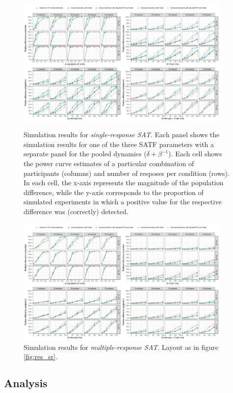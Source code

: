 \documentclass[10pt,letterpaper]{article}
\begin{document}
\begin{figure}
\centering
\includegraphics[width=0.94\textwidth]{../figures/results/results_sr.pdf} %
\caption{\label{fig:res_sr}Simulation results for \textit{single-response SAT}. Each panel shows the simulation results for one of the three SATF parameters with a separate panel for the pooled dynamics ($\delta+\beta^{-1}$). Each cell shows the power curve estimates of a particular combination of participants (columns) and number of resposes per condition (rows). In each cell, the x-axis represents the magnitude of the population difference, while the y-axis corresponds to the proportion of simulated experiments in which a positive value for the respective difference was (correctly) detected.}

\includegraphics[width=0.94\textwidth]{../figures/results/results_mr.pdf} %
\caption{\label{fig:res_mr}Simulation results for \textit{multiple-response SAT}. Layout as in figure \ref{fig:res_sr}.}
\end{figure}

\subsection{Analysis}\label{analysis}
\end{document}
